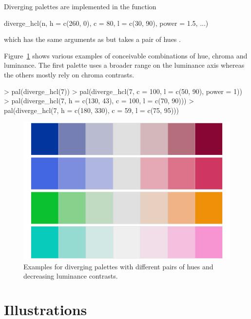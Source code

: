 \documentclass{Z}
\begin{document}
Diverging palettes are implemented in the function
\begin{Soutput}
diverge_hcl(n, h = c(260, 0), c = 80, l = c(30, 90), power = 1.5, ...) 
\end{Soutput}
which has the same arguments as  but takes a pair of hues .

Figure~\ref{fig:pal-d-examples} shows various examples of conceivable combinations of
hue, chroma and luminance. The first palette uses a broader range on the luminance axis
whereas the others mostly rely on chroma contrasts.
\begin{Schunk}
\begin{Sinput}
> pal(diverge_hcl(7))
> pal(diverge_hcl(7, c = 100, l = c(50, 90), power = 1))
> pal(diverge_hcl(7, h = c(130, 43), c = 100, l = c(70, 90)))
> pal(diverge_hcl(7, h = c(180, 330), c = 59, l = c(75, 95)))
\end{Sinput}
\end{Schunk}

\begin{figure}[t!]
\begin{center}
\includegraphics{hcl-colors-pal-d1}
\caption{\label{fig:pal-d-examples} Examples for diverging palettes with different
pairs of hues and decreasing luminance contrasts.}
\end{center}
\end{figure}

\section{Illustrations} \label{sec:illustrations}
\end{document}
